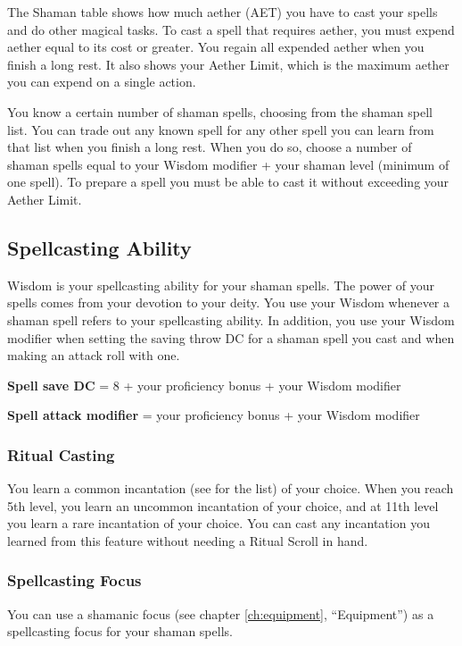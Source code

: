 The Shaman table shows how much aether (AET) you have to cast your spells and do other magical tasks. To cast a spell that requires aether, you must expend aether equal to its cost or greater. You regain all expended aether when you finish a long rest. It also shows your Aether Limit, which is the maximum aether you can expend on a single action.

You know a certain number of shaman spells, choosing from the shaman spell list. You can trade out any known spell for any other spell you can learn from that list when you finish a long rest. When you do so, choose a number of shaman spells equal to your Wisdom modifier + your shaman level (minimum of one spell). To prepare a spell you must be able to cast it without exceeding your Aether Limit.

\subsection{Spellcasting Ability}

Wisdom is your spellcasting ability for your shaman spells. The power of your spells comes from your devotion to your deity. You use your Wisdom whenever a shaman spell refers to your spellcasting ability. In addition, you use your Wisdom modifier when setting the saving throw DC for a shaman spell you cast and when making an attack roll with one.

\textbf{Spell save DC} = 8 + your proficiency bonus + your Wisdom modifier

\textbf{Spell attack modifier} = your proficiency bonus + your Wisdom modifier

\subsubsection{Ritual Casting}

You learn a common incantation (see  for the list) of your choice. When you reach 5th level, you learn an uncommon incantation of your choice, and at 11th level you learn a rare incantation of your choice. You can cast any incantation you learned from this feature without needing a Ritual Scroll in hand.

\subsubsection{Spellcasting Focus}

You can use a shamanic focus (see chapter \ref{ch:equipment}, “Equipment”) as a spellcasting focus for your shaman spells.

